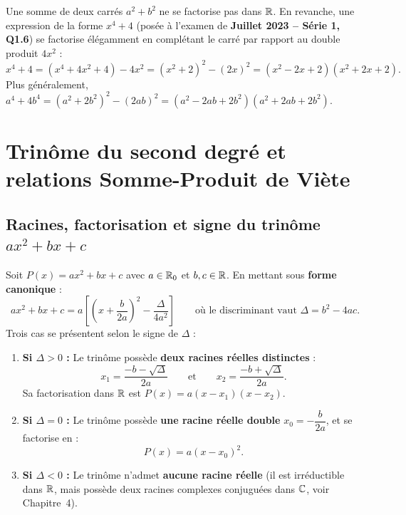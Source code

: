 \begin{astuce}
Une somme de deux carrés $a^2 + b^2$ ne se factorise pas dans $\mathbb{R}$. En revanche, une expression de la forme $x^4 + 4$ (posée à l'examen de \textbf{Juillet 2023 -- Série 1, Q1.6}) se factorise élégamment en complétant le carré par rapport au double produit $4x^2$ :
\[
    x^4 + 4 = (x^4 + 4x^2 + 4) - 4x^2 = (x^2 + 2)^2 - (2x)^2 = \boxed{(x^2 - 2x + 2)(x^2 + 2x + 2)}.
\]
Plus généralement, $a^4 + 4b^4 = (a^2 + 2b^2)^2 - (2ab)^2 = (a^2 - 2ab + 2b^2)(a^2 + 2ab + 2b^2)$.
\end{astuce}

\section{Trinôme du second degré et relations Somme-Produit de Viète}

\subsection{Racines, factorisation et signe du trinôme $ax^2 + bx + c$}

\begin{theoreme}
Soit $P(x) = ax^2 + bx + c$ avec $a \in \mathbb{R}_0$ et $b, c \in \mathbb{R}$. En mettant sous \textbf{forme canonique} :
\[
    ax^2 + bx + c = a\left[\left(x + \frac{b}{2a}\right)^2 - \frac{\Delta}{4a^2}\right] \qquad \text{où le discriminant vaut } \boxed{\Delta = b^2 - 4ac}.
\]
Trois cas se présentent selon le signe de $\Delta$ :
\begin{enumerate}
    \item \textbf{Si $\Delta > 0$ :} Le trinôme possède \textbf{deux racines réelles distinctes} :
    \[
        x_1 = \frac{-b - \sqrt{\Delta}}{2a} \qquad \text{et} \qquad x_2 = \frac{-b + \sqrt{\Delta}}{2a}.
    \]
    Sa factorisation dans $\mathbb{R}$ est $\boxed{P(x) = a(x - x_1)(x - x_2)}$.
    \item \textbf{Si $\Delta = 0$ :} Le trinôme possède \textbf{une racine réelle double} $x_0 = -\dfrac{b}{2a}$, et se factorise en :
    \[
        \boxed{P(x) = a(x - x_0)^2}.
    \]
    \item \textbf{Si $\Delta < 0$ :} Le trinôme n'admet \textbf{aucune racine réelle} (il est irréductible dans $\mathbb{R}$, mais possède deux racines complexes conjuguées dans $\mathbb{C}$, voir Chapitre~4).
\end{enumerate}
\end{theoreme}

